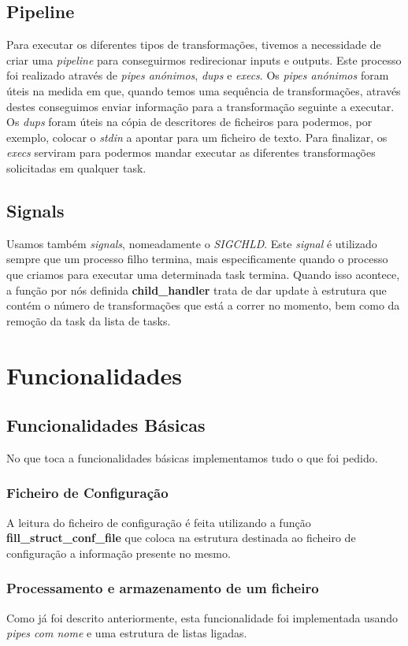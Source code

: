 \documentclass[11pt,a4paper]{report}
\begin{document}
    \section{Pipeline}
    Para executar os diferentes tipos de transformações, tivemos a necessidade de criar uma \textit{pipeline} para conseguirmos redirecionar inputs e outputs. Este processo foi realizado através de \textit{pipes anónimos}, \textit{dups} e \textit{execs}. Os \textit{pipes anónimos} foram úteis na medida em que, quando temos uma sequência de transformações, através destes conseguimos enviar informação para a transformação seguinte a executar. Os \textit{dups} foram úteis na cópia de descritores de ficheiros para podermos, por exemplo, colocar o \textit{stdin} a apontar para um ficheiro de texto. Para finalizar, os \textit{execs} serviram para podermos mandar executar as diferentes transformações solicitadas em qualquer task.
    
    \section{Signals}
    Usamos também \textit{signals}, nomeadamente o \textit{SIGCHLD}. Este \textit{signal} é utilizado sempre que um processo filho termina, mais especificamente quando o processo que criamos para executar uma determinada task termina. Quando isso acontece, a função por nós definida \textbf{child\_handler} trata de dar update à estrutura que contém o número de transformações que está a correr no momento, bem como da remoção da task da lista de tasks.
	   
	\chapter{Funcionalidades}
    
    \section{Funcionalidades Básicas}	
    No que toca a funcionalidades básicas implementamos tudo o que foi pedido.
	\subsection{Ficheiro de Configuração}
	A leitura do ficheiro de configuração é feita utilizando a função \textbf{fill\_struct\_conf\_file} que coloca na estrutura destinada ao ficheiro de configuração a informação presente no mesmo.
	
	\subsection{Processamento e armazenamento de um ficheiro}
	Como já foi descrito anteriormente, esta funcionalidade foi implementada usando \textit{pipes com nome} e uma estrutura de listas ligadas.
	
\end{document}
